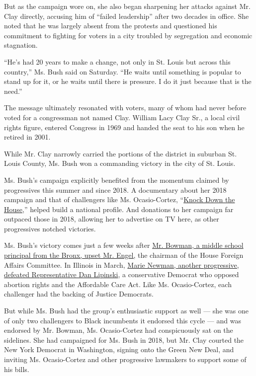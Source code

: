 But as the campaign wore on, she also began sharpening her attacks
against Mr. Clay directly, accusing him of ``failed leadership'' after
two decades in office. She noted that he was largely absent from the
protests and questioned his commitment to fighting for voters in a city
troubled by segregation and economic stagnation.

``He's had 20 years to make a change, not only in St. Louis but across
this country,'' Ms. Bush said on Saturday. ``He waits until something is
popular to stand up for it, or he waits until there is pressure. I do it
just because that is the need.''

The message ultimately resonated with voters, many of whom had never
before voted for a congressman not named Clay. William Lacy Clay Sr., a
local civil rights figure, entered Congress in 1969 and handed the seat
to his son when he retired in 2001.

While Mr. Clay narrowly carried the portions of the district in suburban
St. Louis County, Ms. Bush won a commanding victory in the city of St.
Louis.

Ms. Bush's campaign explicitly benefited from the momentum claimed by
progressives this summer and since 2018. A documentary about her 2018
campaign and that of challengers like Ms. Ocasio-Cortez,
``\href{https://www.nytimes.com/2019/04/30/movies/knock-down-the-house-review.html}{Knock
Down the House},'' helped build a national profile. And donations to her
campaign far outpaced those in 2018, allowing her to advertise on TV
here, as other progressives notched victories.

Ms. Bush's victory comes just a few weeks after
\href{https://www.nytimes.com/2020/07/17/nyregion/jamaal-bowman-eliot-engel.html}{Mr.
Bowman, a middle school principal from the Bronx, upset Mr. Engel,} the
chairman of the House Foreign Affairs Committee. In Illinois in March,
\href{https://www.nytimes.com/2020/03/18/us/politics/marie-newman-dan-lipinski-illinois.html}{Marie
Newman, another progressive, defeated Representative Dan Lipinski}, a
conservative Democrat who opposed abortion rights and the Affordable
Care Act. Like Ms. Ocasio-Cortez, each challenger had the backing of
Justice Democrats.

But while Ms. Bush had the group's enthusiastic support as well --- she
was one of only two challengers to Black incumbents it endorsed this
cycle --- and was endorsed by Mr. Bowman, Ms. Ocasio-Cortez had
conspicuously sat on the sidelines. She had campaigned for Ms. Bush in
2018, but Mr. Clay courted the New York Democrat in Washington, signing
onto the Green New Deal, and inviting Ms. Ocasio-Cortez and other
progressive lawmakers to support some of his bills.


